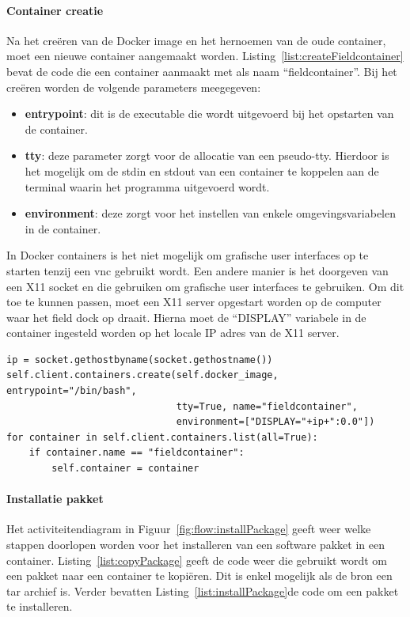 \paragraph{Container creatie}
Na het creëren van de Docker image en het hernoemen van de oude container, moet een nieuwe container aangemaakt worden.
Listing~\ref{list:createFieldcontainer} bevat de code die een container aanmaakt met als naam ``fieldcontainer''.
Bij het creëren worden de volgende parameters meegegeven:
\begin{itemize}
\item \textbf{entrypoint}: dit is de executable die wordt uitgevoerd bij het opstarten van de container.
\item \textbf{tty}: deze parameter zorgt voor de allocatie van een pseudo-tty. 
Hierdoor is het mogelijk om de stdin en stdout van een container te koppelen aan de terminal waarin het programma uitgevoerd wordt.
\item \textbf{environment}: deze zorgt voor het instellen van enkele omgevingsvariabelen in de container.
\end{itemize}
In Docker containers is het niet mogelijk om grafische user interfaces op te starten tenzij een vnc gebruikt wordt.
Een andere manier is het doorgeven van een X11 socket en die gebruiken om grafische user interfaces te gebruiken.
Om dit toe te kunnen passen, moet een X11 server opgestart worden op de computer waar het field dock op draait.
Hierna moet de ``DISPLAY'' variabele in de container ingesteld worden op het locale IP adres van de X11 server.

\begin{minipage}{\linewidth}
\begin{center}
\begin{lstlisting}[caption={Creatie van fieldcontainer},label={list:createFieldcontainer}]
ip = socket.gethostbyname(socket.gethostname())
self.client.containers.create(self.docker_image, entrypoint="/bin/bash",
                              tty=True, name="fieldcontainer",
                              environment=["DISPLAY="+ip+":0.0"])
for container in self.client.containers.list(all=True):
    if container.name == "fieldcontainer":
        self.container = container
\end{lstlisting}
\end{center}
\end{minipage}

\paragraph{Installatie pakket}
Het activiteitendiagram in Figuur~\ref{fig:flow:installPackage} geeft weer welke stappen doorlopen worden voor het installeren van een software pakket in een container.
Listing~\ref{list:copyPackage} geeft de code weer die gebruikt wordt om een pakket naar een container te kopiëren.
Dit is enkel mogelijk als de bron een tar archief is.
Verder bevatten Listing~\ref{list:installPackage}de code om een pakket te installeren.

